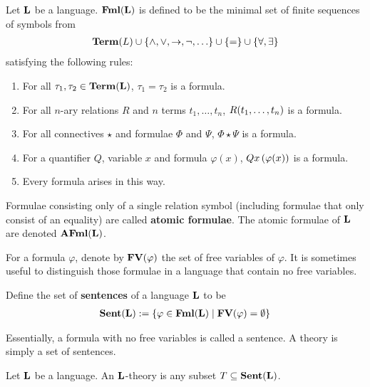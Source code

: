 \begin{boxdefinition}[Formulae]
    Let $\mathbf{L}$ be a language. $\mathbf{Fml}(\mathbf{L})$ is defined to be the minimal set of finite sequences of symbols from
    \begin{align*}
        \mathbf{Term}\!\left( L \right) \cup \left\{ \land, \lor, \to, \neg, \ldots \right\} \cup \left\{ = \right\} \cup \left\{ \forall, \exists \right\}
    \end{align*}
    satisfying the following rules:
    \begin{enumerate}
        \item For all $\tau_1, \tau_2 \in \mathbf{Term}\!\left( \mathbf{L} \right)$, $\tau_1 = \tau_2$ is a formula.
        \item For all $n$-ary relations $R$ and $n$ terms $t_1, \ldots, t_n$, $R\!\left( t_1, \ldots, t_n \right)$ is a formula.
        \item For all connectives $\star$ and formulae $\Phi$ and $\Psi$, $\Phi \star \Psi$ is a formula.
        \item For a quantifier $Q$, variable $x$ and formula $\varphi(x)$, $Qx \left( \varphi\!\left( x \right) \right)$ is a formula.
        \item Every formula arises in this way.
    \end{enumerate}
    Formulae consisting only of a single relation symbol (including formulae that only consist of an equality) are called \textbf{atomic formulae}. The atomic formulae of $\mathbf{L}$ are denoted $\mathbf{AFml}(\mathbf{L})$.
\end{boxdefinition}

For a formula $\varphi$, denote by $\mathbf{FV}\!\left( \varphi \right)$ the set of free variables of $\varphi$. It is sometimes useful to distinguish those formulae in a language that contain no free variables.

\begin{boxdefinition}
    Define the set of \textbf{sentences} of a language $\mathbf{L}$ to be
    \begin{align*}
        \mathbf{Sent}\!\left( \mathbf{L} \right) := \left\{ \varphi \in \mathbf{Fml}\!\left( \mathbf{L} \right) \; \middle\vert \; \mathbf{FV}\!\left( \varphi \right) = \emptyset \right\}
    \end{align*}
\end{boxdefinition}

Essentially, a formula with no free variables is called a sentence. A theory is simply a set of sentences.

\begin{boxdefinition}[Theory]
    Let $\mathbf{L}$ be a language. An $\mathbf{L}$-theory is any subset $T \subseteq \mathbf{Sent}(\mathbf{L})$.
\end{boxdefinition}

